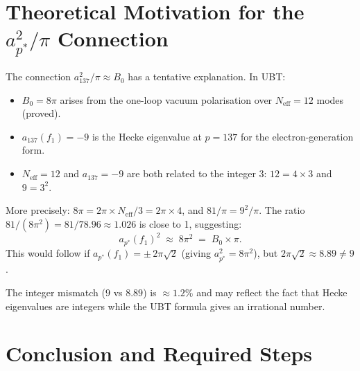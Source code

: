 \documentclass[12pt,a4paper]{article}
\theoremstyle{definition}
\theoremstyle{remark}
\begin{document}
\section{Theoretical Motivation for the $a_{p^*}^2/\pi$ Connection}
\label{sec:theoretical}

The connection $a_{137}^2/\pi \approx B_0$ has a tentative explanation.
In UBT:
\begin{itemize}
  \item $B_0 = 8\pi$ arises from the one-loop vacuum polarisation over
        $N_{\mathrm{eff}} = 12$ modes (proved).
  \item $a_{137}(f_1) = -9$ is the Hecke eigenvalue at $p = 137$ for the
        electron-generation form.
  \item $N_{\mathrm{eff}} = 12$ and $a_{137} = -9$ are both related to
        the integer 3: $12 = 4 \times 3$ and $9 = 3^2$.
\end{itemize}

More precisely: $8\pi = 2\pi \times N_{\mathrm{eff}}/3 = 2\pi \times 4$,
and $81/\pi = 9^2/\pi$.  The ratio $81/(8\pi^2) = 81/78.96 \approx 1.026$
is close to 1, suggesting:
\begin{equation}
  a_{p^*}(f_1)^2 \;\approx\; 8\pi^2 \;=\; B_0 \times \pi.
\end{equation}
This would follow if $a_{p^*}(f_1) = \pm\,2\pi\sqrt{2}$ (giving
$a_{p^*}^2 = 8\pi^2$), but $2\pi\sqrt{2} \approx 8.89 \neq 9$.

The integer mismatch ($9$ vs $8.89$) is $\approx 1.2\%$ and may reflect
the fact that Hecke eigenvalues are integers while the UBT formula gives
an irrational number.

\section{Conclusion and Required Steps}
\label{sec:conclusion}
\end{document}
